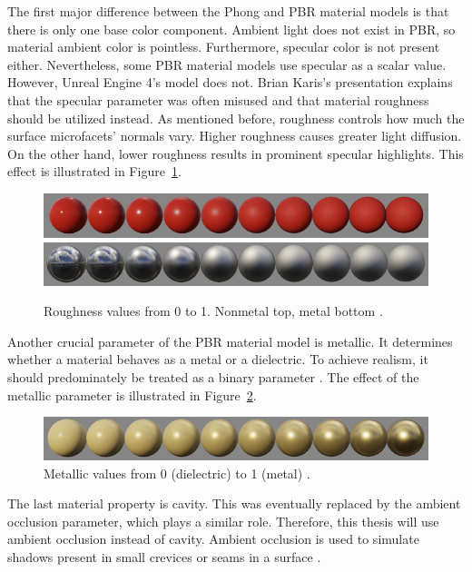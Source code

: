 \documentclass[
  digital,     %
  oneside,     %
  nosansbold,  %
  nocolorbold, %
  lof,         %
  lot,         %
]{fithesis4}
\begin{document}
The first major difference between the Phong and PBR material models is that there is only one base color component.
Ambient light does not exist in PBR, so material ambient color is pointless. Furthermore, specular color is not
present either. Nevertheless, some PBR material models use specular as a scalar value. However, Unreal Engine 4's
model does not. Brian Karis's presentation \cite{ue-real-shading} explains that the specular parameter
was often misused and that material roughness should be utilized instead. As mentioned before, roughness controls
how much the surface microfacets' normals vary. Higher roughness causes greater light diffusion. On the other
hand, lower roughness results in prominent specular highlights. This effect is illustrated in Figure~\ref{fig:roughness}.
\begin{figure}[H]
    \centering
    \includegraphics[width=\textwidth]{images/roughness_nonmetal.png}
    \includegraphics[width=\textwidth]{images/roughness_metal.png}
    \caption{Roughness values from 0 to 1. Nonmetal top, metal bottom \cite{ue-pbr}.}
    \label{fig:roughness}
\end{figure}

Another crucial parameter of the PBR material model is metallic.
It determines whether a material behaves as a metal or a dielectric.
To achieve realism, it should predominately be treated as a binary parameter \cite{ue-pbr}.
The effect of the metallic parameter is illustrated in Figure~\ref{fig:metallic}.
\begin{figure}[H]
    \centering
    \includegraphics[width=\textwidth]{images/metallic.png}
    \caption{Metallic values from 0 (dielectric) to 1 (metal) \cite{ue-pbr}.}
    \label{fig:metallic}
\end{figure}

The last material property is cavity. This was eventually replaced by the ambient occlusion parameter,
which plays a similar role. Therefore, this thesis will use ambient occlusion instead of cavity.
Ambient occlusion is used to simulate shadows present in small crevices or seams in a surface
\cite{ue-real-shading}\cite{ue-material-inputs}.
\end{document}
